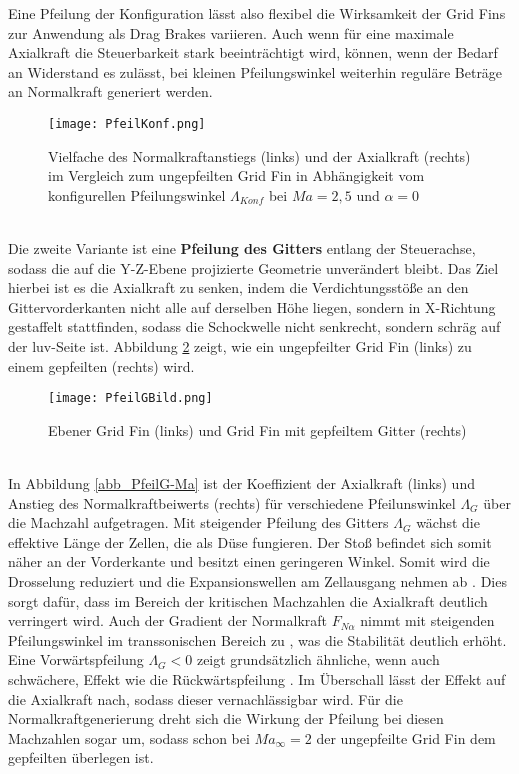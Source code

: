 Eine Pfeilung der Konfiguration lässt also flexibel die Wirksamkeit der Grid Fins zur Anwendung als Drag Brakes variieren. Auch wenn für eine maximale Axialkraft die Steuerbarkeit stark beeinträchtigt wird, können, wenn der Bedarf an Widerstand es zulässt, bei kleinen Pfeilungswinkel weiterhin reguläre Beträge an Normalkraft generiert werden.
\begin{figure}[h]
	\centering
	\texttt{[image: PfeilKonf.png]}
	\caption{Vielfache des Normalkraftanstiegs (links) und der Axialkraft (rechts) im Vergleich zum ungepfeilten Grid Fin in Abhängigkeit vom konfigurellen Pfeilungswinkel $\Lambda_{Konf}$ bei $Ma = 2,5$ und $\alpha = 0$}
	\label{abb_lastvielfache}
\end{figure}\\
Die zweite Variante ist eine \textbf{Pfeilung des Gitters} entlang der Steuerachse, sodass die auf die Y-Z-Ebene projizierte Geometrie unverändert bleibt. Das Ziel hierbei ist es die Axialkraft zu senken, indem die Verdichtungsstöße an den Gittervorderkanten nicht alle auf derselben Höhe liegen, sondern in X-Richtung gestaffelt stattfinden, sodass die Schockwelle nicht senkrecht, sondern schräg auf der luv-Seite ist. Abbildung \ref{abb_PfeilG} zeigt, wie ein ungepfeilter Grid Fin (links) zu einem gepfeilten (rechts) wird.
\begin{figure}[h]
	\centering
	\texttt{[image: PfeilGBild.png]}
	\caption{Ebener Grid Fin (links) und Grid Fin mit gepfeiltem Gitter (rechts)}
	\label{abb_PfeilG}
\end{figure}\\
In Abbildung \ref{abb_PfeilG-Ma} ist der Koeffizient der Axialkraft (links) und Anstieg des Normalkraftbeiwerts (rechts) für verschiedene Pfeilunswinkel $\Lambda_{G}$ über die Machzahl aufgetragen. Mit steigender Pfeilung des Gitters $\Lambda_G$ wächst die effektive Länge der Zellen, die als Düse fungieren. Der Stoß befindet sich somit näher an der Vorderkante und besitzt einen geringeren Winkel. Somit wird die Drosselung reduziert und die Expansionswellen am Zellausgang nehmen ab \cite{PfeilG1}. Dies sorgt dafür, dass im Bereich der kritischen Machzahlen die Axialkraft deutlich verringert wird. Auch der Gradient der Normalkraft $F_{N\alpha}$ nimmt mit steigenden Pfeilungswinkel im transsonischen Bereich zu \cite{PfeilG1}, was die Stabilität deutlich erhöht. Eine Vorwärtspfeilung $\Lambda_{G} < 0$ zeigt grundsätzlich ähnliche, wenn auch schwächere, Effekt wie die Rückwärtspfeilung \cite{PfeilG2}. Im Überschall lässt der Effekt auf die Axialkraft nach, sodass dieser vernachlässigbar wird. Für die Normalkraftgenerierung dreht sich die Wirkung der Pfeilung bei diesen Machzahlen sogar um, sodass schon bei $Ma_\infty=2$ der ungepfeilte Grid Fin dem gepfeilten überlegen ist.


